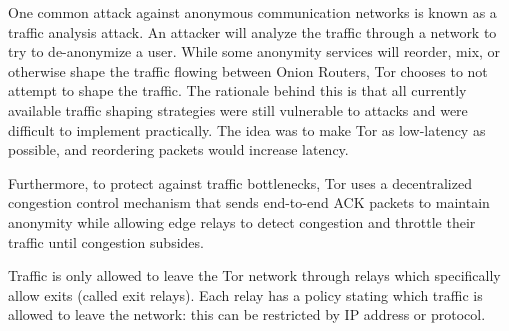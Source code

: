 \documentclass[12pt,journal]{IEEEtran}
\begin{document}
\par
One common attack against anonymous communication networks is known as a traffic analysis attack. An attacker will analyze the traffic through a network to try to de-anonymize a user. While some anonymity services will reorder, mix, or otherwise shape the traffic flowing between Onion Routers, Tor chooses to not attempt to shape the traffic. The rationale behind this is that all currently available traffic shaping strategies were still vulnerable to attacks and were difficult to implement practically. The idea was to make Tor as low-latency as possible, and reordering packets would increase latency.
\par
Furthermore, to protect against traffic bottlenecks, Tor uses a decentralized congestion control mechanism that sends end-to-end ACK packets to maintain anonymity while allowing edge relays to detect congestion and throttle their traffic until congestion subsides.
\par
Traffic is only allowed to leave the Tor network through relays which specifically allow exits (called exit relays). Each relay has a policy stating which traffic is allowed to leave the network: this can be restricted by IP address or protocol. \cite{Dingledine:2004:TSO:1251375.1251396}
\end{document}

